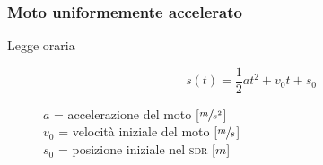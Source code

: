 \documentclass[a4paper,11pt,italian]{article}
\begin{document}
\subsubsection{Moto uniformemente accelerato}
\begin{description}
  \item[Legge oraria] 
  \[ s(t) = \frac{1}{2} a t^2 + v_0 t + s_0 \] 
  \begin{multicols}{2}
  $ a $ = accelerazione del moto [$ \sfrac{m}{s^2} $]\\
  $ v_0 $ = velocità iniziale del moto [$ \sfrac{m}{s} $]\\
  $ s_0 $ = posizione iniziale nel \textsc{sdr} [$ m $]
  \end{multicols}
  
%   
%
%
\end{description}
\end{document}
